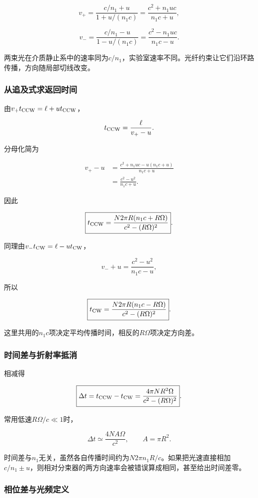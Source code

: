\documentclass[12pt,a4paper,fontset=fandol]{ctexart}
\begin{document}
\[
v_+=\frac{c/n_1+u}{1+u/(n_1c)}
=\frac{c^2+n_1uc}{n_1c+u},
\]

\[
v_-=\frac{c/n_1-u}{1-u/(n_1c)}
=\frac{c^2-n_1uc}{n_1c-u}.
\]

两束光在介质静止系中的速率同为\(c/n_1\)，实验室速率不同。光纤约束让它们沿环路传播，方向随局部切线改变。

\subsubsection{从追及式求返回时间}\label{ux4eceux8ffdux53caux5f0fux6c42ux8fd4ux56deux65f6ux95f4}

由\(v_+t_{\rm CCW}=\ell+ut_{\rm CCW}\)，

\[
t_{\rm CCW}=\frac{\ell}{v_+-u}.
\]

分母化简为

\[
\begin{aligned}
v_+-u
&=\frac{c^2+n_1uc-u(n_1c+u)}{n_1c+u}\\
&=\frac{c^2-u^2}{n_1c+u}.
\end{aligned}
\]

因此

\[
\boxed{
t_{\rm CCW}
=\frac{N2\pi R(n_1c+R\Omega)}
{c^2-(R\Omega)^2}}.
\]

同理由\(v_-t_{\rm CW}=\ell-ut_{\rm CW}\)，

\[
v_-+u=\frac{c^2-u^2}{n_1c-u},
\]

所以

\[
\boxed{
t_{\rm CW}
=\frac{N2\pi R(n_1c-R\Omega)}
{c^2-(R\Omega)^2}}.
\]

这里共用的\(n_1c\)项决定平均传播时间，相反的\(R\Omega\)项决定方向差。

\subsubsection{时间差与折射率抵消}\label{ux65f6ux95f4ux5deeux4e0eux6298ux5c04ux7387ux62b5ux6d88}

相减得

\[
\boxed{
\Delta t=t_{\rm CCW}-t_{\rm CW}
=\frac{4\pi NR^2\Omega}
{c^2-(R\Omega)^2}}.
\]

常用低速\(R\Omega/c\ll1\)时，

\[
\boxed{\Delta t\simeq\frac{4N A\Omega}{c^2}},
\qquad A=\pi R^2.
\]

时间差与\(n_1\)无关，虽然各自传播时间约为\(N2\pi n_1R/c\)。如果把光速直接相加\(c/n_1\pm u\)，则相对分束器的两方向速率会被错误算成相同，甚至给出时间差零。

\subsubsection{相位差与光频定义}\label{ux76f8ux4f4dux5deeux4e0eux5149ux9891ux5b9aux4e49}
\end{document}
